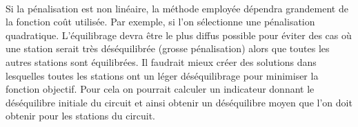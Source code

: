 \documentclass[a4paper, 11pt]{article} %
\begin{document}
\paragraph*{}
Si la pénalisation est non linéaire, la méthode employée dépendra grandement de la fonction coût utilisée. Par exemple, si l'on sélectionne une pénalisation quadratique. L'équilibrage devra être le plus diffus possible pour éviter des cas où une station serait très déséquilibrée (grosse pénalisation) alors que toutes les autres stations sont équilibrées. Il faudrait mieux créer des solutions dans lesquelles toutes les stations ont un léger déséquilibrage pour minimiser la fonction objectif. Pour cela on pourrait calculer un indicateur donnant le déséquilibre initiale du circuit et ainsi obtenir un déséquilibre moyen que l'on doit obtenir pour les stations du circuit.
\end{document}
